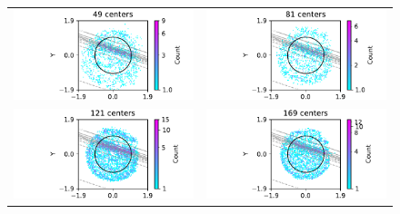 \documentclass[12pt]{report} %
\begin{document}
\begin{figure}
  \hspace*{-2cm}
  \begin{tabular}{cc}
    \includegraphics[width=.6\textwidth]{imagenes/experiments/2d/statistical_2d_full_scheduler_interpolation/arctan_2d/circle_c49_arctan_paper_2d_gaussian_kernel.pdf}  &
    \includegraphics[width=.6\textwidth]{imagenes/experiments/2d/statistical_2d_full_scheduler_interpolation/arctan_2d/circle_c81_arctan_paper_2d_gaussian_kernel.pdf}    \\
    \includegraphics[width=.6\textwidth]{imagenes/experiments/2d/statistical_2d_full_scheduler_interpolation/arctan_2d/circle_c121_arctan_paper_2d_gaussian_kernel.pdf} &
    \includegraphics[width=.6\textwidth]{imagenes/experiments/2d/statistical_2d_full_scheduler_interpolation/arctan_2d/circle_c169_arctan_paper_2d_gaussian_kernel.pdf}   \\

\end{tabular}
\end{figure}
\end{document}

